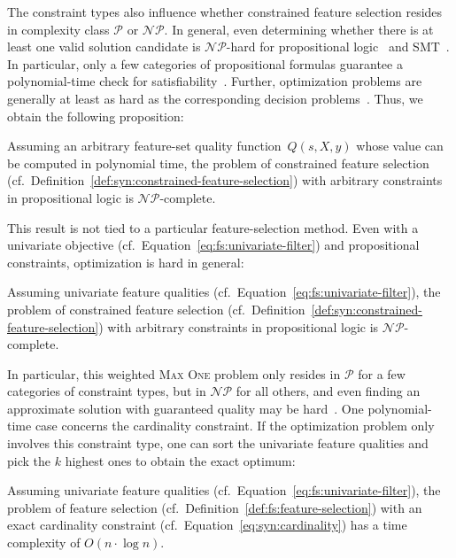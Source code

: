 The constraint types also influence whether constrained feature selection resides in complexity class $\mathcal{P}$ or $\mathcal{NP}$.
In general, even determining whether there is at least one valid solution candidate is $\mathcal{NP}$-hard for propositional logic~\cite{cook1971complexity} and SMT~\cite{barrett2018satisfiability}.
In particular, only a few categories of propositional formulas guarantee a polynomial-time check for satisfiability~\cite{schaefer1978complexity}.
Further, optimization problems are generally at least as hard as the corresponding decision problems~\cite{garey2003computers}.
Thus, we obtain the following proposition:
%
\begin{proposition}
	Assuming an arbitrary feature-set quality function~$Q(s,X,y)$ whose value can be computed in polynomial time,
	the problem of constrained feature selection (cf.~Definition~\ref{def:syn:constrained-feature-selection}) with arbitrary constraints in propositional logic is $\mathcal{NP}$-complete.
	\label{prop:syn:complexity-constrained-np}
\end{proposition}
%
This result is not tied to a particular feature-selection method.
Even with a univariate objective (cf.~Equation~\ref{eq:fs:univariate-filter}) and propositional constraints, optimization is hard in general:
%
\begin{proposition}
	Assuming univariate feature qualities (cf.~Equation~\ref{eq:fs:univariate-filter}),
	the problem of constrained feature selection (cf.~Definition~\ref{def:syn:constrained-feature-selection}) with arbitrary constraints in propositional logic is $\mathcal{NP}$-complete.
	\label{prop:syn:complexity-constrained-univariate-np}
\end{proposition}
%
In particular, this weighted \textsc{Max One} problem only resides in $\mathcal{P}$ for a few categories of constraint types, but in $\mathcal{NP}$ for all others, and even finding an approximate solution with guaranteed quality may be hard~\cite{khanna1997complete}.
One polynomial-time case concerns the cardinality constraint.
If the optimization problem only involves this constraint type, one can sort the univariate feature qualities and pick the $k$ highest ones to obtain the exact optimum:
%
\begin{proposition}
	Assuming univariate feature qualities (cf.~Equation~\ref{eq:fs:univariate-filter}),
	the problem of feature selection (cf.~Definition~\ref{def:fs:feature-selection}) with an exact cardinality constraint (cf.~Equation~\ref{eq:syn:cardinality}) has a time complexity of $O(n \cdot \log n)$.
	\label{prop:syn:complexity-cardinality-univariate-np}
\end{proposition}

